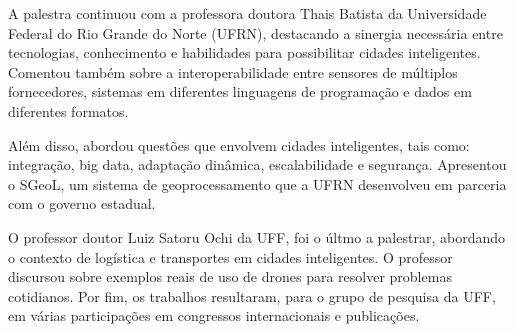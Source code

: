 A palestra continuou com a professora doutora Thais Batista da Universidade Federal do Rio Grande do Norte (UFRN), destacando a sinergia necessária entre tecnologias, conhecimento e habilidades para possibilitar cidades inteligentes. Comentou também sobre a interoperabilidade entre sensores de múltiplos fornecedores, sistemas em diferentes linguagens de programação e dados em diferentes formatos.

Além disso, abordou questões que envolvem cidades inteligentes, tais como: integração, big data, adaptação dinâmica, escalabilidade e segurança. Apresentou o SGeoL, um sistema de geoprocessamento que a UFRN desenvolveu em parceria com o governo estadual.

O professor doutor Luiz Satoru Ochi da UFF,  foi o últmo a palestrar, abordando o contexto de logística e transportes em cidades inteligentes. O professor discursou sobre exemplos reais de uso de drones para resolver problemas cotidianos. Por fim, os trabalhos resultaram, para o grupo de pesquisa da UFF, em várias participações em congressos internacionais e publicações. 
